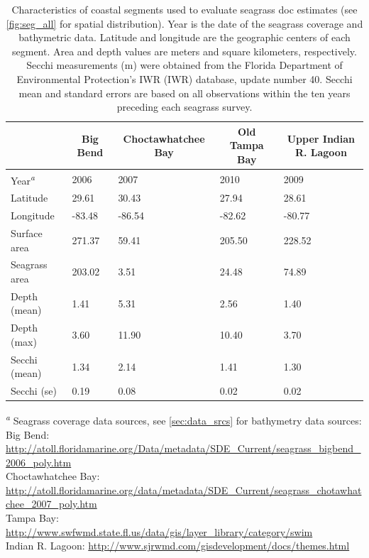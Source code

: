 \documentclass[letterpaper,12pt,oneside]{article}\usepackage[]{graphicx}\usepackage[]{color}
\begin{document}
\begin{table}[!tbp]
\caption{Characteristics of coastal segments used to evaluate seagrass \acl{doc} estimates (see \cref{fig:seg_all} for spatial distribution).  Year is the date of the seagrass coverage and bathymetric data.  Latitude and longitude are the geographic centers of each segment.  Area and depth values are meters and square kilometers, respectively.  Secchi measurements (m) were obtained from the Florida Department of Environmental Protection's \acl{IWR} (\acs{IWR}) database, update number 40.  Secchi mean and standard errors are based on all observations within the ten years preceding each seagrass survey.\label{tab:seg_summ}} 
\begin{center}
\begin{tabular}{lllll}
\hline\hline
\multicolumn{1}{l}{}&\multicolumn{1}{c}{Big Bend}&\multicolumn{1}{c}{Choctawhatchee Bay}&\multicolumn{1}{c}{Old Tampa Bay}&\multicolumn{1}{c}{Upper Indian R. Lagoon}\tabularnewline
\hline
Year\textsuperscript{\textit{a}}&2006&2007&2010&2009\tabularnewline
Latitude& 29.61& 30.43& 27.94& 28.61\tabularnewline
Longitude&-83.48&-86.54&-82.62&-80.77\tabularnewline
Surface area&271.37& 59.41&205.50&228.52\tabularnewline
Seagrass area&203.02&  3.51& 24.48& 74.89\tabularnewline
Depth (mean)&  1.41&  5.31&  2.56&  1.40\tabularnewline
Depth (max)&  3.60& 11.90& 10.40&  3.70\tabularnewline
Secchi (mean)&  1.34&  2.14&  1.41&  1.30\tabularnewline
Secchi (se)&  0.19&  0.08&  0.02&  0.02\tabularnewline
\hline
\end{tabular}\end{center}

\footnotesize \textsuperscript{\textit{a}} Seagrass coverage data sources, see \cref{sec:data_srcs} for bathymetry data sources:\scriptsize\\Big Bend: \url{http://atoll.floridamarine.org/Data/metadata/SDE_Current/seagrass_bigbend_2006_poly.htm}\\Choctawhatchee Bay: \url{http://atoll.floridamarine.org/data/metadata/SDE_Current/seagrass_chotawhatchee_2007_poly.htm}\\Tampa Bay: \url{http://www.swfwmd.state.fl.us/data/gis/layer_library/category/swim}\\Indian R. Lagoon: \url{http://www.sjrwmd.com/gisdevelopment/docs/themes.html}\end{table}
\end{document}
